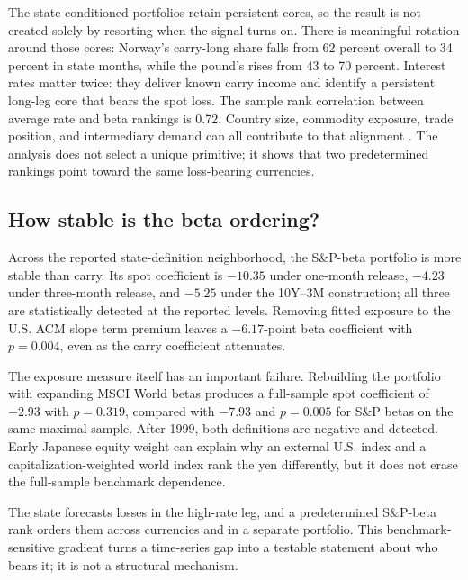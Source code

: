 The state-conditioned portfolios retain persistent cores, so the result is not created solely by resorting when the signal turns on. There is meaningful rotation around those cores: Norway's carry-long share falls from 62 percent overall to 34 percent in state months, while the pound's rises from 43 to 70 percent. Interest rates matter twice: they deliver known carry income and identify a persistent long-leg core that bears the spot loss. The sample rank correlation between average rate and beta rankings is 0.72. Country size, commodity exposure, trade position, and intermediary demand can all contribute to that alignment \citep{hassan2013,ready2017,dellaCorte2016,richmond2019,hassanMano2019,gabaixMaggiori2015}. The analysis does not select a unique primitive; it shows that two predetermined rankings point toward the same loss-bearing currencies.



\subsection{How stable is the beta ordering?}

Across the reported state-definition neighborhood, the S\&P-beta portfolio is more stable than carry. Its spot coefficient is $-10.35$ under one-month release, $-4.23$ under three-month release, and $-5.25$ under the 10Y--3M construction; all three are statistically detected at the reported levels. Removing fitted exposure to the U.S. ACM slope term premium leaves a $-6.17$-point beta coefficient with $p=0.004$, even as the carry coefficient attenuates.

The exposure measure itself has an important failure. Rebuilding the portfolio with expanding MSCI World betas produces a full-sample spot coefficient of $-2.93$ with $p=0.319$, compared with $-7.93$ and $p=0.005$ for S\&P betas on the same maximal sample. After 1999, both definitions are negative and detected. Early Japanese equity weight can explain why an external U.S. index and a capitalization-weighted world index rank the yen differently, but it does not erase the full-sample benchmark dependence.


The state forecasts losses in the high-rate leg, and a predetermined S\&P-beta rank orders them across currencies and in a separate portfolio. This benchmark-sensitive gradient turns a time-series gap into a testable statement about who bears it; it is not a structural mechanism.
